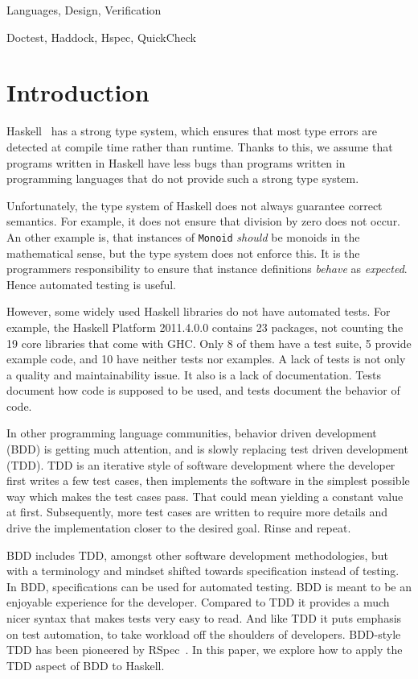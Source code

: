 \documentclass[preprint]{sigplanconf}
\begin{document}

\terms Languages, Design, Verification

\keywords Doctest, Haddock, Hspec, QuickCheck

\section{Introduction}
\label{sec:introduction}


Haskell~\cite{haskell} has a strong type system, which ensures that most type errors are
detected at compile time rather than runtime.  Thanks to this, we assume that
programs written in Haskell have less bugs than programs written in programming
languages that do not provide such a strong type system.

Unfortunately, the type system of Haskell does not always guarantee
correct semantics.
For example, it does not ensure that division by zero does not occur.
An other example is, that instances of {\tt Monoid} \emph{should} be
monoids in the mathematical sense, but the type system does not
enforce this.  It is the programmers responsibility to ensure that
instance definitions \emph{behave} as \emph{expected}.  Hence
automated testing is useful.

However, some widely used Haskell libraries do not have automated
tests.  For example, the Haskell Platform 2011.4.0.0 contains 23
packages, not counting the 19 core libraries that come with GHC.  Only
8 of them have a test suite, 5 provide example code, and 10 have
neither tests nor examples.  A lack of tests is not only a quality and
maintainability issue.  It also is a lack of documentation.  Tests
document how code is supposed to be used, and tests document the
behavior of code.

In other programming language communities, behavior driven development
(BDD) is getting much attention, and is slowly replacing test driven
development (TDD).  TDD is an iterative style of software development
where the developer first writes a few test cases, then implements the
software in the simplest possible way which makes the test cases pass.
That could mean yielding a constant value at first.  Subsequently,
more test cases are written to require more details and drive the
implementation closer to the desired goal.  Rinse and repeat.

BDD includes TDD, amongst other software development methodologies,
but with a terminology and mindset shifted towards
specification instead of testing.
In BDD, specifications can be used for
automated testing.
BDD is meant to be an enjoyable experience for the developer.
Compared to TDD it provides a much nicer syntax that
makes tests very easy to read.  And like TDD it puts emphasis on
test automation, to take workload off the shoulders of
developers.
BDD-style TDD has been pioneered by
RSpec~\cite{rspec}.  In this paper, we explore how to apply the TDD
aspect of BDD to Haskell.
\end{document}

